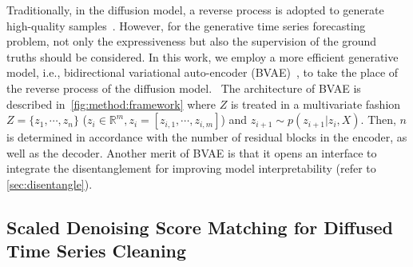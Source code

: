 Traditionally, in the diffusion model, a reverse process is adopted to generate high-quality samples~\cite{sohl2015deep,ho2020denoising}. 
However, for the generative time series forecasting problem, 
not only the expressiveness but also the supervision of the ground truths should be considered. 
In this work, 
we employ a more efficient generative model, i.e.,  bidirectional variational auto-encoder (BVAE)~\cite{vahdat2020nvae}, to take the place of the reverse process of the diffusion model.~%
The architecture of BVAE is described in~\cref{fig:method:framework} where $Z$ is treated in a multivariate fashion $Z = \{z_1, \cdots, z_n\}$ ($ z_i \in \mathbb{R}^{m}, z_i = [z_{i,1}, \cdots, z_{i,m}] $) and $z_{i+1} \sim p(z_{i+1}|z_{i}, X)$.
Then, $n$ is determined in accordance with the number of residual blocks in the encoder, as well as the decoder. 
Another merit of BVAE is that it opens an interface to integrate the disentanglement for improving model interpretability (refer to \cref{sec:disentangle}).

\subsection{Scaled Denoising Score Matching for Diffused Time Series Cleaning} \label{sec_denoise}

